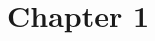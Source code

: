 \documentclass[../main.tex]{subfiles}
\begin{document}
\chapter{Chapter 1}
\label{chapter:1}
\end{document}
